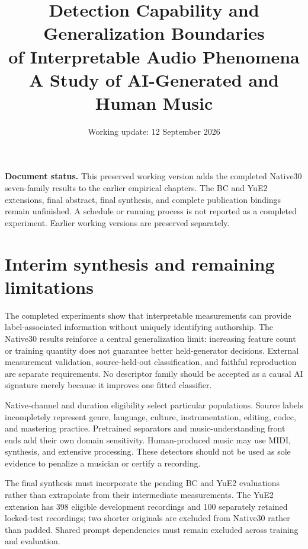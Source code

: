 \documentclass[11pt,a4paper]{article}
\title{Detection Capability and Generalization Boundaries\\of Interpretable Audio Phenomena\\
\large A Study of AI-Generated and Human Music}
\author{}
\date{Working update: 12 September 2026}
\begin{document}
\maketitle
\noindent\textbf{Document status.} This preserved working version adds the completed
Native30 seven-family results to the earlier empirical chapters. The BC and YuE2
extensions, final abstract, final synthesis, and complete publication bindings
remain unfinished. A schedule or running process is not reported as a completed
experiment. Earlier working versions are preserved separately.
\tableofcontents
\clearpage










\section{Interim synthesis and remaining limitations}
The completed experiments show that interpretable measurements can provide
label-associated information without uniquely identifying authorship. The
Native30 results reinforce a central generalization limit: increasing feature
count or training quantity does not guarantee better held-generator decisions.
External measurement validation, source-held-out classification, and faithful
reproduction are separate requirements. No descriptor family should be accepted
as a causal AI signature merely because it improves one fitted classifier.

Native-channel and duration eligibility select particular populations. Source
labels incompletely represent genre, language, culture, instrumentation, editing,
codec, and mastering practice. Pretrained separators and music-understanding
front ends add their own domain sensitivity. Human-produced music may use MIDI,
synthesis, and extensive processing. These detectors should not be used as sole
evidence to penalize a musician or certify a recording.

The final synthesis must incorporate the pending BC and YuE2 evaluations rather
than extrapolate from their intermediate measurements. The YuE2 extension has
398 eligible development recordings and 100 separately retained locked-test
recordings; two shorter originals are excluded from Native30 rather than padded.
Shared prompt dependencies must remain excluded across training and evaluation.



\end{document}
